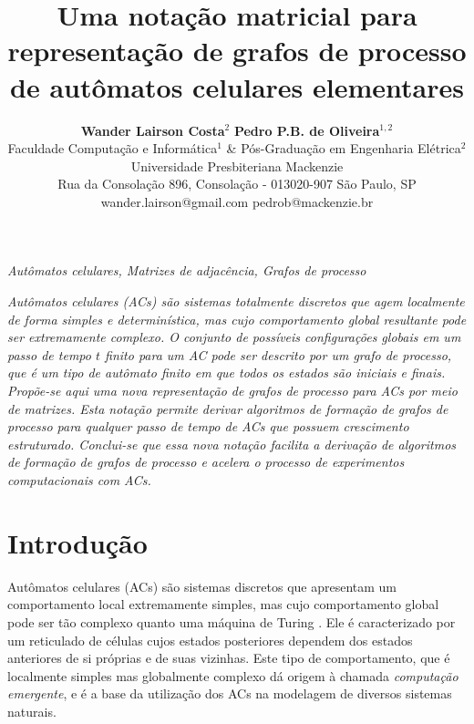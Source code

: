 \documentclass[a4,11pt]{article}
\begin{document}
\title{ \Large{\bf Uma notação matricial para representação de grafos de processo de autômatos celulares elementares}}

\author{ {\bf {\large Wander Lairson Costa$^2$}} \hspace*{1cm} {\bf {\large
 Pedro P.B. de Oliveira$^{1,2}$}}  \\
 {\small Faculdade Computação e Informática$^1$ \& Pós-Graduação em Engenharia Elétrica$^2$} \\
 {\small Universidade Presbiteriana Mackenzie} \\
 {\small Rua da Consolação 896, Consolação - 013020-907 São Paulo, SP} \\
 {\small wander.lairson@gmail.com \hspace*{.2cm}  pedrob@mackenzie.br} }

\date{}

\maketitle

\thispagestyle{empty}
 {\it Autômatos celulares, Matrizes de adjacência, Grafos de processo}

\vspace{5ex}

\textit{Autômatos celulares (ACs) são sistemas totalmente discretos que agem
localmente de forma simples e determinística, mas cujo comportamento
global resultante pode ser extremamente complexo. O conjunto de possíveis
configurações globais em um passo de tempo $t$ finito para um AC pode ser
descrito por um grafo de processo, que é um tipo de autômato finito em que
todos os estados são iniciais e finais. Propõe-se aqui uma nova representação
de grafos de processo para ACs por meio de matrizes. Esta notação
permite derivar algoritmos de formação de grafos de processo para qualquer passo
de tempo de ACs que possuem crescimento estruturado.
Conclui-se que essa nova notação facilita a derivação de algoritmos de formação de
grafos de processo e acelera o processo de experimentos computacionais com ACs.}

\section{Introdução} 

Autômatos celulares (ACs) são sistemas discretos que apresentam um comportamento
local extremamente simples, mas cujo comportamento global pode ser tão
complexo quanto uma máquina de Turing \cite{wolfram1984a}. Ele
é caracterizado por um reticulado de células cujos estados posteriores
dependem dos estados anteriores de si próprias e de suas vizinhas.
Este tipo de comportamento, que é localmente simples mas globalmente
complexo dá origem à chamada \textit{computação emergente}, e é
a base da utilização dos ACs na modelagem de diversos sistemas naturais.
\end{document}
